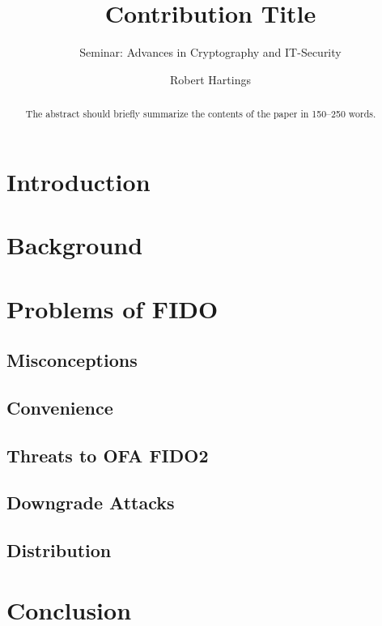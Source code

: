 \documentclass[runningheads]{llncs}
\begin{document}
%
\title{Contribution Title}
\subtitle{Seminar: Advances in Cryptography and IT-Security}
%
%

\author{Robert Hartings}

%
\maketitle              %
%
\begin{abstract}
The abstract should briefly summarize the contents of the paper in
150--250 words.

\end{abstract}
%
%
%
\section{Introduction}
\section{Background}
\section{Problems of FIDO}
\subsection{Misconceptions}
\subsection{Convenience}
\subsection{Threats to OFA FIDO2}
\subsection{Downgrade Attacks}
\subsection{Distribution}
\section{Conclusion}


\end{document}

